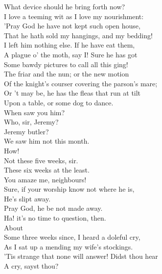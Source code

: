 \documentclass[a4paper,oneside]{memoir}
\begin{document}
\begin{drama*}
\lovewitspeaks {} What device should he bring forth now?\\
I love a teeming wit as I love my nourishment:\\
'Pray God he have not kept such open house,\\
That he hath sold my hangings, and my bedding!\\
I left him nothing else. If he have eat them,\\
A plague o' the moth, say I! Sure he has got\\
Some bawdy pictures to call all this ging!\\
The friar and the nun; or the new motion\\
Of the knight's courser covering the parson's mare;\\
Or 't may be, he has the fleas that run at tilt\\
Upon a table, or some dog to dance.\\
When saw you him?\\
\neighonespeaks {} Who, sir, Jeremy?\\
\neightwospeaks {} Jeremy butler?\\
We saw him not this month.\\
\lovewitspeaks {} How!\\
\neighfourspeaks {} Not these five weeks, sir.\\
\neighsixspeaks These six weeks at the least.\\
\lovewitspeaks {} You amaze me, neighbours!\\
\neighfivespeaks Sure, if your worship know not where he is,\\
He's slipt away.\\
\neighsixspeaks {} Pray God, he be not made away.\\
\lovewitspeaks Ha! it's no time to question, then.\\
\neighsixspeaks {} About\\
Some three weeks since, I heard a doleful cry,\\
As I sat up a mending my wife's stockings.\\
\lovewitspeaks 'Tis strange that none will answer! Didst thou hear\\
A cry, sayst thou?\\

\end{drama*}
\end{document}
